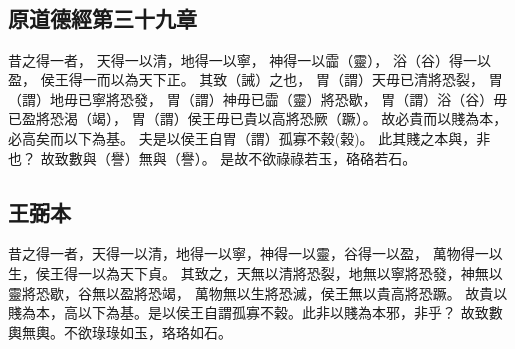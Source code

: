 ﻿%
%

\chapter{~}

\section{原道德經第三十九章}

\begin{withgezhu}

\zhsong


昔之得一者，
天得一以清，地得\colorbox{adding-color}{一}以寧，
神得一以霝（\textcolor{tongjia-color}{靈}），
浴（\textcolor{tongjia-color}{谷}）得一以盈，
侯\colorbox{adding-color}{王得一}而以為\colorbox{adding-color}{天下}正。
其致（\textcolor{tongjia-color}{誡}）之也，
胃（\textcolor{tongjia-color}{謂}）天毋已清將恐\colorbox{adding-color}{裂}，
胃（\textcolor{tongjia-color}{謂}）地毋\colorbox{adding-color}{已寧}將恐\colorbox{adding-color}{發}，
胃（\textcolor{tongjia-color}{謂}）神毋\colorbox{missing-color}{已霝（\textcolor{tongjia-color}{靈}）}\textcolor{wangbi-color}{將}\colorbox{adding-color}{恐歇}，
胃（\textcolor{tongjia-color}{謂}）浴（\textcolor{tongjia-color}{谷}）毋已\colorbox{missing-color}{盈}將恐渴（\textcolor{tongjia-color}{竭}），
胃（\textcolor{tongjia-color}{謂}）侯王毋已貴\colorbox{adding-color}{以高將恐厥（\textcolor{tongjia-color}{蹶}）}。
故必貴而以賤為本，必高矣而以下為基。
夫是以侯王自胃（\textcolor{tongjia-color}{謂}）孤寡不榖(\textcolor{tongjia-color}{榖})。
此其\colorbox{adding-color}{賤之本與，非也}？
故致數與（\textcolor{tongjia-color}{譽}）無與（\textcolor{tongjia-color}{譽}）。
是故不欲\colorbox{adding-color}{祿祿}若玉，硌\colorbox{adding-color}{硌若石}。

\end{withgezhu}

\section{王弼本}

\begin{withgezhu}

\zhsong

昔之得一者，天得一以清，地得一以寧，神得一以靈，谷得一以盈，
萬物得一以生，侯王得一以為天下貞。
其致之，天無以清將恐裂，地無以寧將恐發，神無以靈將恐歇，谷無以盈將恐竭，
萬物無以生將恐滅，侯王無以貴高將恐蹶。
故貴以賤為本，高以下為基。是以侯王自謂孤寡不榖。此非以賤為本邪，非乎？
故致數輿無輿。不欲琭琭如玉，珞珞如石。

\end{withgezhu}
